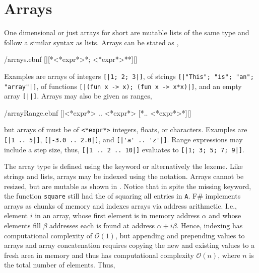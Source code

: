 \section{Arrays}
\label{sec:arrays}
One dimensional  or just arrays for short are mutable lists of the same type and follow a similar syntax as lists. Arrays can be stated as ,
%
\begin{verbatimwrite}{\ebnf/arrays.ebnf}
[|[*<*expr*>{*; <*expr*>*}*]|]
\end{verbatimwrite}
%
Examples are arrays of integers \mbox{\lstinline![|1; 2; 3|]!}, of strings \mbox{\lstinline![|"This"; "is"; "an"; "array"|]!}, of functions \mbox{\lstinline![|(fun x -> x); (fun x -> x*x)|]!}, and an empty array \lstinline![||]!.  Arrays may also be given as ranges,
%
\begin{verbatimwrite}{\ebnf/arrayRange.ebnf}
[|<*expr*> .. <*expr*> [*.. <*expr*>*]|]
\end{verbatimwrite}
%
but arrays of  must be of \lstinline[language=syntax]{<*expr*>} integers, floats, or characters. Examples are \mbox{\lstinline![|1 .. 5|]!}, \mbox{\lstinline![|-3.0 .. 2.0|]!}, and \mbox{\lstinline![|'a' .. 'z'|]!}. Range expressions may include a step size, thus, \mbox{\lstinline![|1 .. 2 .. 10|]!} evaluates to \mbox{\lstinline![|1; 3; 5; 7; 9|]!}.

The array type is defined using the  keyword or alternatively the \lexeme{[]} lexeme.  Like strings and lists, arrays may be indexed using the  notation. Arrays cannot be resized, but are mutable as shown in .
%
%
Notice that in spite the missing  keyword, the function \lstinline{square} still had the  of squaring all entries in \lstinline{A}.  F\# implements arrays as chunks of memory and indexes arrays via address arithmetic. I.e., element $i$ in an array, whose first element is in memory address $\alpha$ and whose elements fill $\beta$ addresses each is found at address $\alpha+i\beta$. Hence, indexing has computational complexity of $\mathcal{O}(1)$, but appending and prepending values to arrays and array concatenation requires copying the new and existing values to a fresh area in memory and thus has computational complexity $\mathcal{O}(n)$, where $n$ is the total number of elements. Thus, 

